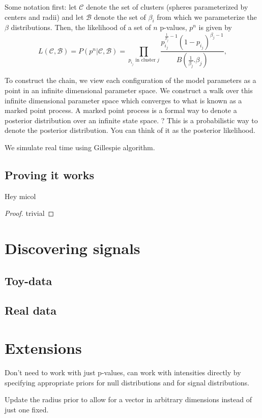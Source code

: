 \documentclass[12pt]{article}
\begin{document}
Some notation first: let $\mathcal{C}$ denote the set of clusters (spheres parameterized by centers and radii) and let $\mathcal{B}$ denote the set of $\beta_i$ from which 
we parameterize the $\beta$ distributions. Then, the likelihood of a set of $n$ p-values, $p^n$ is given by
 \[
L(\mathcal{C}, \mathcal{B}) = P( p^n | \mathcal{C}, \mathcal{B}) = \prod_{\mbox{$p_{i_j}$ in cluster $j$}}  \frac{ p_{i_j}^{\frac{1}{\beta_j} - 1} (1 - p_{i_j})^{\beta_j-1}}{B(\frac{1}{\beta_j}. \beta_j)},
\]

To construct the chain,  we view each configuration of the model parameters as a point in an infinite dimensional parameter space. 
We construct a  walk over this infinite dimensional parameter space which converges to what is known as a marked point process. 
A marked point process is a formal way to denote a posterior distribution over an infinite state space. ? 
This is a probabilistic way to denote the posterior distribution. 
You can think of it as the posterior likelihood. 

We simulate real time using Gillespie algorithm.


\subsection{Proving it works}





\begin{theorem}
Hey micol 
\end{theorem}
\begin{proof} 
trivial 
\end{proof}



\section{Discovering signals}

\subsection{Toy-data}

\subsection{Real data}


\section{Extensions}
Don't need to work with just p-values, can work with intensities directly by specifying appropriate priors for null distributions
and for signal distributions. 

Update the radius prior to allow for a vector in arbitrary dimensions instead of just one fixed. 




\end{document}
